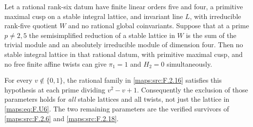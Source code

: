 \begin{theorem}\label{maps:src:F.2.19}


Let a rational rank-six datum have finite linear orders five
and four, a primitive maximal cusp on a stable integral lattice,
and invariant line $L$, with irreducible rank-five quotient $W$
and no rational global coinvariants.  Suppose that at a prime
$p\ne2,5$ the semisimplified reduction of a stable lattice in
$W$ is the sum of the trivial module and an absolutely
irreducible module of dimension four.  Then no stable integral
lattice in that rational datum, with primitive maximal cusp,
and no free finite affine twists can give
$\pi_1=1$ and $H_2=0$ simultaneously.

For every $v\notin\{0,1\}$, the rational family in \ref{maps:src:F.2.16}
satisfies this hypothesis at each prime dividing
$v^2-v+1$.  Consequently the exclusion of those parameters
holds for \emph{all} stable lattices and all twists, not just
the lattice in \eqref{maps:eq:F.U6}.  The two remaining parameters are the
verified survivors of \ref{maps:src:F.2.6} and \ref{maps:src:F.2.18}.

\end{theorem}


